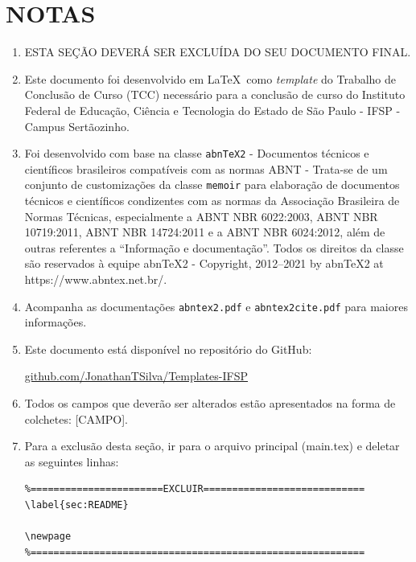 \section{NOTAS}
    \begin{enumerate}
        \item {\color{red} ESTA SEÇÃO DEVERÁ SER EXCLUÍDA DO SEU DOCUMENTO FINAL.}
        
        \item Este documento foi desenvolvido em \LaTeX\ como \textit{template} do Trabalho de Conclusão de Curso (TCC) necessário para a conclusão de curso do Instituto Federal de Educação, Ciência e Tecnologia do Estado de São Paulo - IFSP - Campus Sertãozinho.
        
        \item Foi desenvolvido com base na classe \texttt{abnTeX2} - Documentos técnicos e científicos brasileiros compatíveis com as normas ABNT - Trata-se de um conjunto de customizações da classe \texttt{memoir} para elaboração de documentos técnicos e científicos condizentes com as normas da Associação Brasileira de Normas Técnicas, especialmente a ABNT NBR 6022:2003, ABNT NBR 10719:2011, ABNT NBR 14724:2011 e a ABNT NBR 6024:2012, além de outras referentes a “Informação e documentação”. Todos os direitos da classe são reservados à equipe abnTeX2 - Copyright, 2012–2021 by abnTeX2 at https://www.abntex.net.br/.
        
        \item Acompanha as documentações \texttt{abntex2.pdf} e \texttt{abntex2cite.pdf} para maiores informações.
        
        \item Este documento está disponível no repositório do GitHub:
        
        \begin{center}
            \href{https://github.com/JonathanTSilva/Templates-IFSP}{github.com/JonathanTSilva/Templates-IFSP}
        \end{center}
        
        \item Todos os campos que deverão ser alterados estão apresentados na forma de colchetes: [CAMPO].
        
        \item Para a exclusão desta seção, ir para o arquivo principal  (main.tex) e deletar as seguintes linhas:
        
\begin{verbatim}
%=======================EXCLUIR============================
\label{sec:README}

\newpage
%==========================================================
\end{verbatim}
    \end{enumerate}
     
